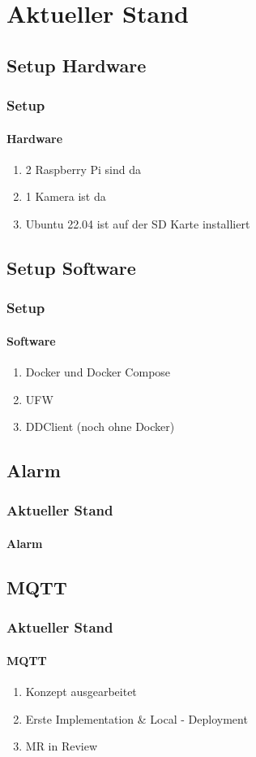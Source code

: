 \documentclass[]{beamer}
\begin{document}
\section{Aktueller Stand}
\subsection{Setup Hardware}
\begin{frame}
\frametitle{Setup}
\framesubtitle{Hardware}
\begin{enumerate}
    \item 2 Raspberry Pi sind da
    \item 1 Kamera ist da
    \item Ubuntu 22.04 ist auf der SD Karte installiert
\end{enumerate}
\end{frame}



\subsection{Setup Software}
\begin{frame}
\frametitle{Setup}
\framesubtitle{Software}

\begin{enumerate}
    \item Docker und Docker Compose
    \item UFW
    \item DDClient (noch ohne Docker)
\end{enumerate}
\end{frame}

\subsection{Alarm}
\begin{frame}
\frametitle{Aktueller Stand}
\framesubtitle{Alarm}
\end{frame}



\subsection{MQTT}
\begin{frame}
\frametitle{Aktueller Stand}
\framesubtitle{MQTT}
\begin{enumerate}
    \item Konzept ausgearbeitet
    \item Erste Implementation \& Local - Deployment
    \item MR in Review
\end{enumerate}
\end{frame}
\end{document}
